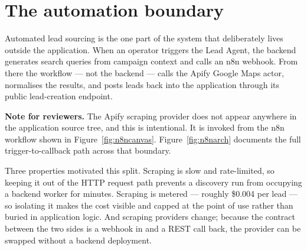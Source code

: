 \documentclass[11pt,a4paper]{report}
\begin{document}
\section{The automation boundary}
\label{sec:n8n}
Automated lead sourcing is the one part of the system that deliberately lives outside the application. When an operator triggers the Lead Agent, the backend generates search queries from campaign context and calls an n8n webhook. From there the workflow --- not the backend --- calls the Apify Google Maps actor, normalises the results, and posts leads back into the application through its public lead-creation endpoint.

\begin{warningbox}
\textbf{Note for reviewers.} The Apify scraping provider does not appear anywhere in the application source tree, and this is intentional. It is invoked from the n8n workflow shown in Figure~\ref{fig:n8ncanvas}. Figure~\ref{fig:n8narch} documents the full trigger-to-callback path across that boundary.
\end{warningbox}

Three properties motivated this split. Scraping is slow and rate-limited, so keeping it out of the HTTP request path prevents a discovery run from occupying a backend worker for minutes. Scraping is metered --- roughly \$0.004 per lead --- so isolating it makes the cost visible and capped at the point of use rather than buried in application logic. And scraping providers change; because the contract between the two sides is a webhook in and a REST call back, the provider can be swapped without a backend deployment.
\end{document}
